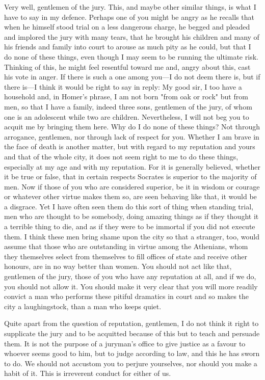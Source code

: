 Very well, gentlemen of the jury. This, and maybe other similar things, is what I have to say
in my defence. Perhaps one of you might be angry as he recalls that when he himself stood trial
on a less dangerous charge, he begged and pleaded and implored the jury with many tears, that he
brought his children and many of his friends and family into court to arouse as much pity as he
could, but that I do none of these things, even though I may seem to be running the ultimate risk.
Thinking of this, he might feel resentful toward me and, angry about this, cast his vote in anger.
If there is such a one among you—I do not deem there is, but if there is—I think it would be right
to say in reply: My good sir, I too have a household and, in Homer's phrase, I am not born "from
oak or rock" but from men, so that I have a family, indeed three sons, gentlemen of the jury, of
whom one is an adolescent while two are children. Nevertheless, I will not beg you to acquit me
by bringing them here. Why do I do none of these things? Not through arrogance, gentlemen, nor
through lack of respect for you. Whether I am brave in the face of death is another matter, but with
regard to my reputation and yours and that of the whole city, it does not seem right to me to do
these things, especially at my age and with my reputation. For it is generally believed, whether it
be true or false, that in certain respects Socrates is superior to the majority of men. Now if those
of you who are considered superior, be it in wisdom or courage or whatever other virtue makes
them so, are seen behaving like that, it would be a disgrace. Yet I have often seen them do this sort
of thing when standing trial, men who are thought to be somebody, doing amazing things as if they
thought it a terrible thing to die, and as if they were to be immortal if you did not execute them.
I think these men bring shame upon the city so that a stranger, too, would assume that those who
are outstanding in virtue among the Athenians, whom they themselves select from themselves to
fill offices of state and receive other honours, are in no way better than women. You should not
act like that, gentlemen of the jury, those of you who have any reputation at all, and if we do, you
should not allow it. You should make it very clear that you will more readily convict a man who
performs these pitiful dramatics in court and so makes the city a laughingstock, than a man who
keeps quiet.

Quite apart from the question of reputation, gentlemen, I do not think it right to supplicate the
jury and to be acquitted because of this but to teach and persuade them. It is not the purpose of a
juryman's office to give justice as a favour to whoever seems good to him, but to judge according
to law, and this he has sworn to do. We should not accustom you to perjure yourselves, nor should
you make a habit of it. This is irreverent conduct for either of us.

